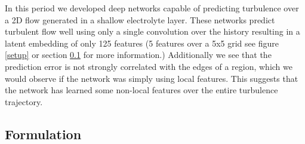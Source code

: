 \documentclass[10pt,letterpaper]{article}
\begin{document}
In this period we developed deep networks capable of predicting turbulence over a 2D  flow generated in a shallow electrolyte layer. These networks predict turbulent flow  well using only a single convolution over the history resulting in a latent embedding of only 125 features (5 features over a 5x5 grid see figure \ref{setup} or section \ref{formulation} for more information.) Additionally we see that the prediction error is not strongly correlated with the edges of a region, which we would observe if the network was simply using local features. This suggests that the network has learned some non-local features over the entire turbulence trajectory.

\subsection{Formulation} \label{formulation}
\end{document}
